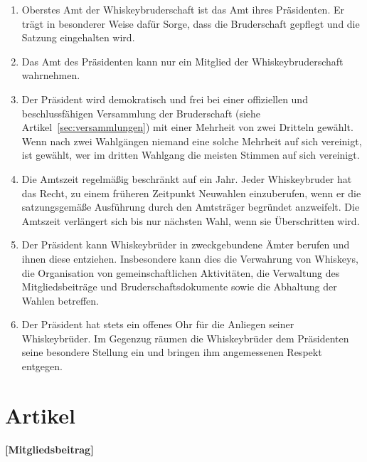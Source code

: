 \documentclass[a4paper,12pt]{scrartcl}
\begin{document}
\begin{enumerate}

\item Oberstes Amt der Whiskeybruderschaft ist das Amt ihres Präsidenten. Er trägt in besonderer
  Weise dafür Sorge, dass die Bruderschaft gepflegt und die Satzung eingehalten wird.

\item Das Amt des Präsidenten kann nur ein Mitglied der Whiskeybruderschaft wahrnehmen.

\item Der Präsident wird demokratisch und frei bei einer offiziellen und beschlussfähigen
  Versammlung der Bruderschaft (siehe Artikel~\ref{sec:versammlungen}) mit einer Mehrheit von zwei
  Dritteln gewählt. Wenn nach zwei Wahlgängen niemand eine solche Mehrheit auf sich vereinigt, ist
  gewählt, wer im dritten Wahlgang die meisten Stimmen auf sich vereinigt.

\item Die Amtszeit regelmäßig beschränkt auf ein Jahr. Jeder Whiskeybruder hat das Recht, zu einem
  früheren Zeitpunkt Neuwahlen einzuberufen, wenn er die satzungsgemäße Ausführung durch den
  Amtsträger begründet anzweifelt. Die Amtszeit verlängert sich bis nur nächsten Wahl, wenn sie
  Überschritten wird.

\item Der Präsident kann Whiskeybrüder in zweckgebundene Ämter berufen und ihnen diese entziehen.
  Insbesondere kann dies die Verwahrung von Whiskeys, die Organisation von gemeinschaftlichen
  Aktivitäten, die Verwaltung des Mitgliedsbeiträge und Bruderschaftsdokumente sowie die Abhaltung
  der Wahlen betreffen.

\item Der Präsident hat stets ein offenes Ohr für die Anliegen seiner Whiskeybrüder. Im Gegenzug
  räumen die Whiskeybrüder dem Präsidenten seine besondere Stellung ein und bringen ihm angemessenen
  Respekt entgegen.

\end{enumerate}


\section{Artikel \thesection}
\label{sec:mitgliedsbeitrag}
\textbf{[Mitgliedsbeitrag]}
\end{document}
